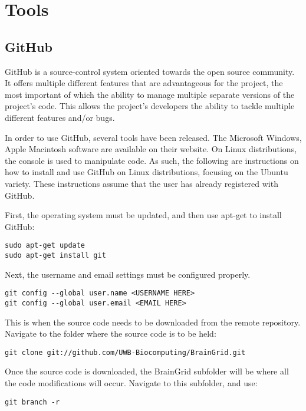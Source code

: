 \section{Tools}
\subsection{GitHub}
\mdseries GitHub is a source-control system oriented towards the open source community. It offers multiple different features that are advantageous for the project, the most important of which the ability to manage multiple separate versions of the project’s code. This allows the project’s developers the ability to tackle multiple different features and/or bugs.

\noindent \mdseries In order to use GitHub, several tools have been released. The Microsoft Windows, Apple Macintosh software are available on their website.  On Linux distributions, the console is used to manipulate code. As such, the following are instructions on how to install and use GitHub on Linux distributions, focusing on the Ubuntu variety. These instructions assume that the user has already registered with GitHub.

\noindent \mdseries First, the operating system must be updated, and then use apt-get to install GitHub:

\begin{verbatim}
sudo apt-get update
sudo apt-get install git
\end{verbatim}

\noindent \mdseries Next, the username and email settings must be configured properly. 
\begin{verbatim}
git config --global user.name <USERNAME HERE>
git config --global user.email <EMAIL HERE>
\end{verbatim}

\noindent This is when the source code needs to be downloaded from the remote repository. Navigate to the folder where the source code is to be held:
\begin{verbatim}
git clone git://github.com/UWB-Biocomputing/BrainGrid.git
\end{verbatim}

\noindent \mdseries Once the source code is downloaded, the BrainGrid subfolder will be where all the code modifications will occur. Navigate to this subfolder, and use:
\begin{verbatim}
git branch -r
\end{verbatim}

